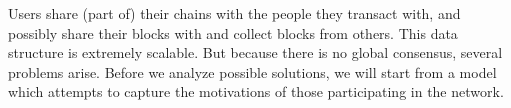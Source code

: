 Users share (part of) their chains with the people they transact with, and possibly share their blocks with and collect blocks from others. This data structure is extremely scalable. But because there is no global consensus, several problems arise. Before we analyze possible solutions, we will start from a model which attempts to capture the motivations of those participating in the network.
